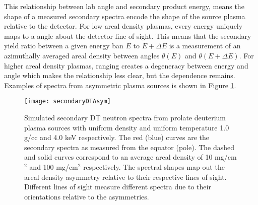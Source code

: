 	This relationship between lab angle and secondary product energy, means the shape of a measured secondary spectra encode the shape of the source plasma relative to the detector. For low areal density plasmas, every energy uniquely maps to a angle about the detector line of sight. This means that the secondary yield ratio between a given energy ban $E$ to $E+\Delta E$ is a measurement of an azimuthally averaged areal density between angles $\theta(E)$ and $\theta(E+\Delta E)$. For higher areal density plasmas, ranging creates a degeneracy between energy and angle which makes the relationship less clear, but the dependence remains. Examples of spectra from asymmetric plasma sources is shown in Figure \ref{secondaryDTAsym}.
	
	\begin{figure}[h!]
		\centering
		\texttt{[image: secondaryDTAsym]}
		\caption[Secondary DT neutron spectra from asymmetric plasmas]{ Simulated secondary DT neutron spectra from prolate deuterium plasma sources with uniform density and uniform temperature 1.0 g/cc and 4.0 keV respectively. The red (blue) curves are the secondary spectra as measured from the equator (pole). The dashed and solid curves correspond to an average areal density of 10 mg/cm$^2$ and 100 mg/cm$^2$ respectively. The spectral shapes map out the areal density asymmetry relative to their respective lines of sight. Different lines of sight measure different spectra due to their orientations relative to the asymmetries.    }
		\label{secondaryDTAsym}
	\end{figure}


